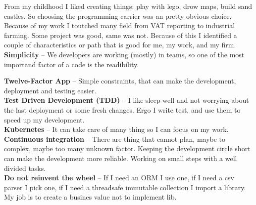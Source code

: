 \documentclass[9pt]{developercv} %
\begin{document}
\vspace{0.5cm}



\begin{minipage}[t]{0.48\textwidth} %
	\vspace{-\baselineskip} %
	From my childhood I liked creating things: play with lego, drow maps, build sand castles.
	So choosing the programming carrier was an pretty obvious choice.
	Because of my work I toutched many field from VAT reporting to industrial farming. 
	Some project was good, same was not. 
	Because of this I identified a couple of characteristics or path that is good for me, my work, and my firm. \\

	\textbf{Simplicity} -- We developers are working (mostly) in teams, so one of the most importand factor of a code is the readibility. \\

\end{minipage}
\hfill %
\begin{minipage}[t]{0.5\textwidth} %
	\vspace{-\baselineskip} %
	\textbf{Twelve-Factor App} -- Simple constraints, that can make the development, deployment and testing easier. \\
	\textbf{Test Driven Development (TDD)} -- I like sleep well and not worrying about the last deployment or some fresh changes. Ergo I write test, and use them to speed up my development. \\
	\textbf{Kubernetes} -- It can take care of many thing so I can focus on my work. \\
	\textbf{Continuous integration} -- There are thing that cannot plan, maybe to complex, maybe too many unknown factor. Keeping the development circle short can make the development more reliable. Working on small steps with a well divided tasks.\\
	\textbf{Do not reinvent the wheel} -- If I need an ORM I use one, 
		if I need a csv parser I pick one, 
		if I need a threadsafe immutable collection I import a library.
		My job is to create a busines value not to implement lib.\\
\end{minipage}
\end{document}
